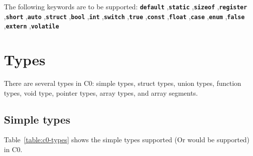 \documentclass[a4paper]{article}
\begin{document}
The following keywords are to be supported:
\textbf{\texttt{default}}
,\textbf{\texttt{static}}
,\textbf{\texttt{sizeof}}
,\textbf{\texttt{register}}
,\textbf{\texttt{short}}
,\textbf{\texttt{auto}}
,\textbf{\texttt{struct}}
,\textbf{\texttt{bool}}
,\textbf{\texttt{int}}
,\textbf{\texttt{switch}}
,\textbf{\texttt{true}}
,\textbf{\texttt{const}}
,\textbf{\texttt{float}}
,\textbf{\texttt{case}}
,\textbf{\texttt{enum}}
,\textbf{\texttt{false}}
,\textbf{\texttt{extern}}
,\textbf{\texttt{volatile}}

{\section{Types}}

There are several types in C0: simple types, struct types, union types, function types, void type, pointer types, array types, and array segments.

{\subsection{Simple types}}

Table~\ref{table:c0-types} shows the simple types supported (Or would be supported) in C0.
\end{document}
